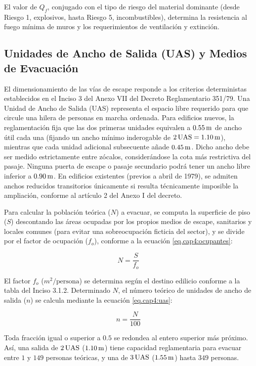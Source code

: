 El valor de $Q_f$, conjugado con el tipo de riesgo del material dominante (desde Riesgo 1, explosivos, hasta Riesgo 5,
incombustibles), determina la resistencia al fuego mínima de muros y los requerimientos de ventilación y extinción.

\subsection{Unidades de Ancho de Salida (UAS) y Medios de Evacuación}

El dimensionamiento de las vías de escape responde a los criterios deterministas establecidos en el Inciso 3 del Anexo VII
del Decreto Reglamentario 351/79. Una Unidad de Ancho de Salida (UAS) representa el espacio libre requerido para que circule
una hilera de personas en marcha ordenada. Para edificios nuevos, la reglamentación fija que las dos primeras unidades equivalen a
$0.55\,\mathrm{m}$ de ancho útil cada una (fijando un ancho mínimo inderogable de $2\,\mathrm{UAS} = 1.10\,\mathrm{m}$), mientras que cada unidad adicional
subsecuente añade $0.45\,\mathrm{m}$. Dicho ancho debe ser medido estrictamente entre zócalos, considerándose la cota más restrictiva del
pasaje. Ninguna puerta de escape o pasaje secundario podrá tener un ancho libre inferior a $0.90\,\mathrm{m}$. En edificios existentes
(previos a abril de 1979), se admiten anchos reducidos transitorios únicamente si resulta técnicamente imposible la ampliación,
conforme al artículo 2 del Anexo I del decreto.

Para calcular la población teórica ($N$) a evacuar, se computa la superficie de piso ($S$) descontando las áreas ocupadas por
los propios medios de escape, sanitarios y locales comunes (para evitar una sobreocupación ficticia del sector), y se divide
por el factor de ocupación ($f_o$), conforme a la ecuación \ref{eq.cap4:ocupantes}:

\begin{equation}
\label{eq.cap4:ocupantes}
N = \frac{S}{f_o}
\end{equation}

El factor $f_o$ ($m^2/\text{persona}$) se determina según el destino edilicio conforme a la tabla del Inciso 3.1.2.
Determinado $N$, el número teórico de unidades de ancho de salida ($n$) se calcula mediante la ecuación \ref{eq.cap4:uas}:

\begin{equation}
\label{eq.cap4:uas}
n = \frac{N}{100}
\end{equation}

Toda fracción igual o superior a $0.5$ se redondea al entero superior más próximo. Así, una salida de $2\,\mathrm{UAS}$ ($1.10\,\mathrm{m}$) tiene
capacidad reglamentaria para evacuar entre $1$ y $149$ personas teóricas, y una de $3\,\mathrm{UAS}$ ($1.55\,\mathrm{m}$) hasta $349$ personas.

